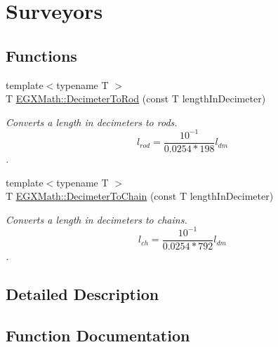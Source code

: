 \hypertarget{group___e_g_x_math-_conversions-_length_conversions-_decimeter-_surveyors}{}\section{Surveyors}
\label{group___e_g_x_math-_conversions-_length_conversions-_decimeter-_surveyors}
\subsection*{Functions}
\begin{DoxyCompactItemize}
\item 
{\footnotesize template$<$typename T $>$ }\\T \mbox{\hyperlink{group___e_g_x_math-_conversions-_length_conversions-_decimeter-_surveyors_gaf34122272f5724db35f8400d284e2ec8}{E\+G\+X\+Math\+::\+Decimeter\+To\+Rod}} (const T length\+In\+Decimeter)
\begin{DoxyCompactList}\small\item\em Converts a length in decimeters to rods. \[ l_{rod}= \frac{10^{-1}}{0.0254 * 198} l_{dm} \]. \end{DoxyCompactList}\item 
{\footnotesize template$<$typename T $>$ }\\T \mbox{\hyperlink{group___e_g_x_math-_conversions-_length_conversions-_decimeter-_surveyors_gaae746f9b34bc92e17f9117f5b139fdc4}{E\+G\+X\+Math\+::\+Decimeter\+To\+Chain}} (const T length\+In\+Decimeter)
\begin{DoxyCompactList}\small\item\em Converts a length in decimeters to chains. \[ l_{ch}= \frac{10^{-1}}{0.0254 * 792} l_{dm} \]. \end{DoxyCompactList}\end{DoxyCompactItemize}


\subsection{Detailed Description}


\subsection{Function Documentation}
\mbox{\label{group___e_g_x_math-_conversions-_length_conversions-_decimeter-_surveyors_gaae746f9b34bc92e17f9117f5b139fdc4}} 
